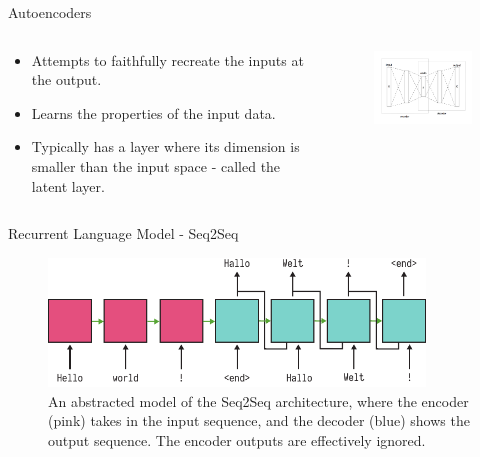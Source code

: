 \documentclass[aspectratio=169, 11pt]{beamer}
\begin{document}
\begin{frame}{Autoencoders}
  \begin{columns}
    \begin{column}{0.5\textwidth}
      \begin{itemize}
        \item Attempts to faithfully recreate the inputs at the output.
        \item Learns the properties of the input data.
        \item Typically has a layer where its dimension is smaller than the input space - called the latent layer.
      \end{itemize}
    \end{column}
    \begin{column}{0.5\textwidth}
      \begin{figure}[!ht]
        \centering
        \includegraphics[width=75mm]{diagrams/autoencoder.png}
        \end{figure}
    \end{column}
  \end{columns}
\end{frame}

\begin{frame}{Recurrent Language Model - Seq2Seq}
  \begin{figure}
  \centering
\includegraphics[width=100mm]{diagrams/seq2seq.pdf}
\caption{An abstracted model of the Seq2Seq architecture, where the encoder (pink) takes in the input sequence, and the decoder (blue) shows the output sequence. The encoder outputs are effectively ignored. \label{seq2seq_diagram}}
\end{figure}
\end{frame}
\end{document}
